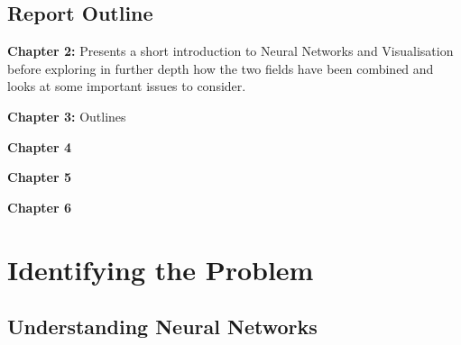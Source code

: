 \documentclass[a4paper,11pt,titlepage]{article}
\begin{document}
	\subsection{Report Outline}
	\textbf{Chapter 2:} Presents a short introduction to Neural Networks and Visualisation before exploring in further depth how the two fields have been combined and looks at some important issues to consider.
	\par
	\textbf{Chapter 3:} Outlines 
	\par
	\textbf{Chapter 4} 
	\par
	\textbf{Chapter 5} 
	\par
	\textbf{Chapter 6} 
	\par	
	
\clearpage

\section{Identifying the Problem}


	\subsection{Understanding Neural Networks}
		
\end{document}
